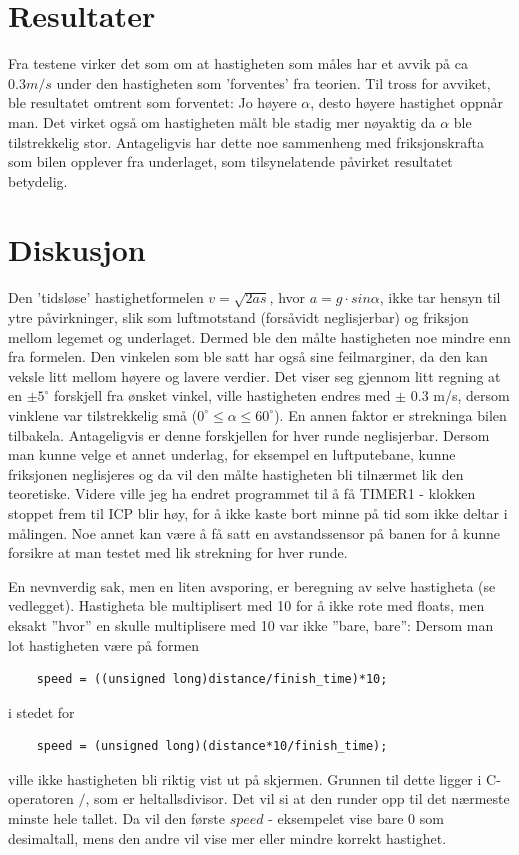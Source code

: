 \documentclass[11pt, a4paper]{report}
\begin{document}
\section{Resultater}

Fra testene virker det som om at hastigheten som måles har et avvik på ca $0.3 m/s$ under den hastigheten som 'forventes' fra teorien. Til tross for avviket, ble resultatet omtrent som forventet: Jo høyere $\alpha$, desto høyere hastighet oppnår man. Det virket også om hastigheten målt ble stadig mer nøyaktig da $\alpha$ ble tilstrekkelig stor. Antageligvis har dette noe sammenheng med friksjonskrafta som bilen opplever fra underlaget, som tilsynelatende påvirket resultatet betydelig.
 
\section{Diskusjon}

Den 'tidsløse' hastighetformelen $v = \sqrt{2as}$, hvor $a = g\cdot sin\alpha$, ikke tar hensyn til ytre påvirkninger, slik som luftmotstand (forsåvidt neglisjerbar) og friksjon mellom legemet og underlaget. Dermed ble den målte hastigheten noe mindre enn fra formelen. Den vinkelen som ble satt har også sine feilmarginer, da den kan veksle litt mellom høyere og lavere verdier. Det viser seg gjennom litt regning at en $\pm 5^{\circ}$ forskjell fra ønsket vinkel, ville hastigheten endres med $\pm$ 0.3 m/s, dersom vinklene var tilstrekkelig små ($0^\circ \leq\alpha\leq 60^\circ$). En annen faktor er strekninga bilen tilbakela. Antageligvis er denne forskjellen for hver runde neglisjerbar.
\newline
Dersom man kunne velge et annet underlag, for eksempel en luftputebane, kunne friksjonen neglisjeres og da vil den målte hastigheten bli tilnærmet lik den teoretiske. Videre ville jeg ha endret programmet til å få TIMER1 - klokken stoppet frem til ICP blir høy, for å ikke kaste bort minne på tid som ikke deltar i målingen. Noe annet kan være å få satt en avstandssensor på banen for å kunne forsikre at man testet med lik strekning for hver runde. 
\newline

En nevnverdig sak, men en liten avsporing, er beregning av selve hastigheta (se vedlegget). Hastigheta ble multiplisert med 10 for å ikke rote med floats, men eksakt ''hvor'' en skulle multiplisere med 10 var ikke ''bare, bare'': Dersom man lot hastigheten være på formen
\begin{lstlisting}
	speed = ((unsigned long)distance/finish_time)*10;
\end{lstlisting}
i stedet for
\begin{lstlisting}
	speed = (unsigned long)(distance*10/finish_time);
\end{lstlisting}
ville ikke hastigheten bli riktig vist ut på skjermen. Grunnen til dette ligger i C-operatoren $/$, som er heltallsdivisor. Det vil si at den runder opp til det nærmeste minste hele tallet. Da vil den første $speed$ - eksempelet vise bare $0$ som desimaltall, mens den andre vil vise mer eller mindre korrekt hastighet. 
\end{document}
